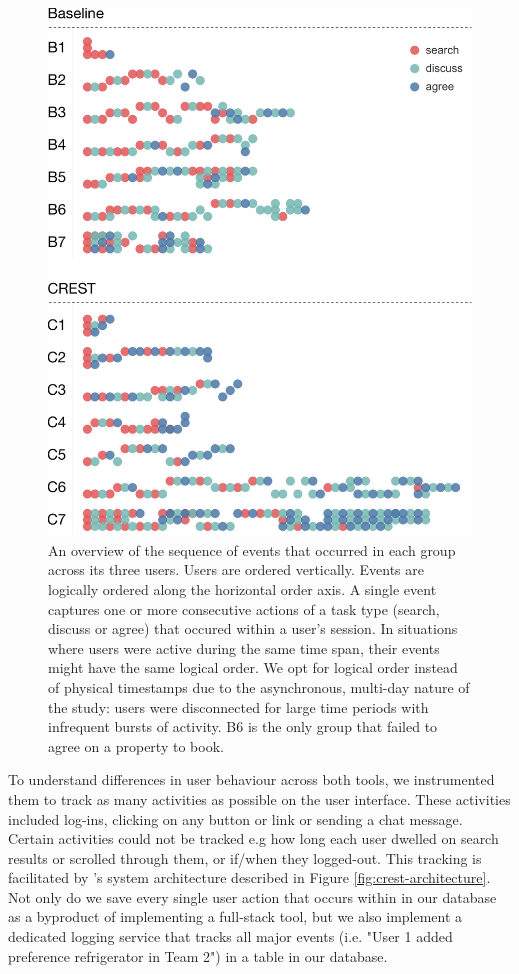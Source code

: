 \begin{figure}[htb]
    \centering
    \includegraphics[width=0.6\linewidth]{images/logical-timelines.pdf}
    \caption{An overview of the sequence of events that occurred in each group across its three users. Users are ordered vertically. Events are logically ordered along the horizontal order axis. A single event captures one or more consecutive actions of a task type (search, discuss or agree) that occured within a user's session. In situations where users were active during the same time span, their events might have the same logical order. We opt for logical order instead of physical timestamps due to the asynchronous, multi-day nature of the study: users were disconnected for large time periods with infrequent bursts of activity. B6 is the only group that failed to agree on a property to book.}
    \label{fig:timelines}
\end{figure}

\smallskip To understand differences in user behaviour across both tools, we instrumented them to track as many activities as possible on the user interface. These activities included log-ins, clicking on any button or link or sending a chat message. Certain activities could not be tracked e.g how long each user dwelled on search results or scrolled through them, or if/when they logged-out. This tracking is facilitated by \tool's system architecture described in Figure \ref{fig:crest-architecture}. Not only do we save every single user action that occurs within \tool in our database as a byproduct of implementing a full-stack tool, but we also implement a dedicated logging service that tracks all major events (i.e. "User 1 added preference refrigerator in Team 2") in a table in our database.

